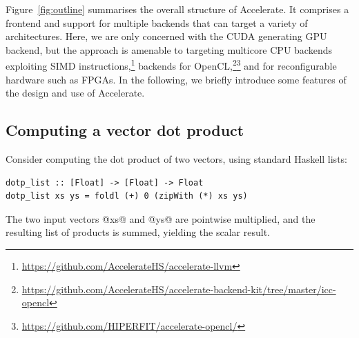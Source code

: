 Figure~\ref{fig:outline} summarises the overall structure of Accelerate. It
comprises a frontend and support for multiple backends that can target a variety
of architectures. Here, we are only concerned with the CUDA generating GPU
backend, but the approach is amenable to targeting multicore CPU backends
exploiting SIMD instructions,\footnote{\url{https://github.com/AccelerateHS/accelerate-llvm}}
backends for OpenCL,\footnote{\url{https://github.com/AccelerateHS/accelerate-backend-kit/tree/master/icc-opencl}}\footnote{\url{https://github.com/HIPERFIT/accelerate-opencl/}}
and for reconfigurable hardware such as FPGAs. In the following, we briefly
introduce some features of the design and use of Accelerate.


\subsection{Computing a vector dot product}
\label{sec:computing_dotp}

Consider computing the dot product of two vectors, using standard Haskell lists:
%
\begin{lstlisting}[style=haskell]
dotp_list :: [Float] -> [Float] -> Float
dotp_list xs ys = foldl (+) 0 (zipWith (*) xs ys)
\end{lstlisting}
%
The two input vectors @xs@ and @ys@ are pointwise multiplied, and the resulting
list of products is summed, yielding the scalar result.

